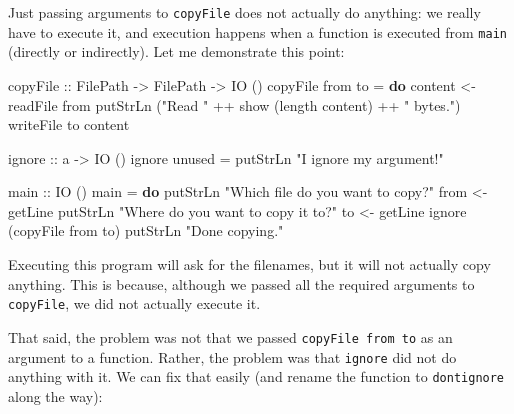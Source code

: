 \documentclass[11pt,
  american,
  DIV13]{article}
\newenvironment{Shaded}{}{}
\newcommand{\DataTypeTok}[1]{\textcolor[rgb]{0.56,0.13,0.00}{#1}}
\newcommand{\FunctionTok}[1]{\textcolor[rgb]{0.02,0.16,0.49}{#1}}
\newcommand{\KeywordTok}[1]{\textcolor[rgb]{0.00,0.44,0.13}{\textbf{#1}}}
\newcommand{\NormalTok}[1]{#1}
\newcommand{\OperatorTok}[1]{\textcolor[rgb]{0.40,0.40,0.40}{#1}}
\newcommand{\OtherTok}[1]{\textcolor[rgb]{0.00,0.44,0.13}{#1}}
\newcommand{\StringTok}[1]{\textcolor[rgb]{0.25,0.44,0.63}{#1}}
\begin{document}
Just passing arguments to \texttt{copyFile} does not actually do
anything: we really have to execute it, and execution happens when a
function is executed from \texttt{main} (directly or indirectly). Let me
demonstrate this point:

\begin{Shaded}
\begin{Highlighting}[]
\OtherTok{copyFile ::} \DataTypeTok{FilePath} \OtherTok{{-}\textgreater{}} \DataTypeTok{FilePath} \OtherTok{{-}\textgreater{}} \DataTypeTok{IO}\NormalTok{ ()}
\NormalTok{copyFile from to }\OtherTok{=} \KeywordTok{do}
\NormalTok{    content }\OtherTok{\textless{}{-}} \FunctionTok{readFile}\NormalTok{ from}
    \FunctionTok{putStrLn}\NormalTok{ (}\StringTok{"Read "} \OperatorTok{++} \FunctionTok{show}\NormalTok{ (}\FunctionTok{length}\NormalTok{ content) }\OperatorTok{++} \StringTok{" bytes."}\NormalTok{)}
    \FunctionTok{writeFile}\NormalTok{ to content}

\OtherTok{ignore ::}\NormalTok{ a }\OtherTok{{-}\textgreater{}} \DataTypeTok{IO}\NormalTok{ ()}
\NormalTok{ignore unused }\OtherTok{=} \FunctionTok{putStrLn} \StringTok{"I ignore my argument!"}

\OtherTok{main ::} \DataTypeTok{IO}\NormalTok{ ()}
\NormalTok{main }\OtherTok{=} \KeywordTok{do}
    \FunctionTok{putStrLn} \StringTok{"Which file do you want to copy?"}
\NormalTok{    from }\OtherTok{\textless{}{-}} \FunctionTok{getLine}
    \FunctionTok{putStrLn} \StringTok{"Where do you want to copy it to?"}
\NormalTok{    to }\OtherTok{\textless{}{-}} \FunctionTok{getLine}
\NormalTok{    ignore (copyFile from to)}
    \FunctionTok{putStrLn} \StringTok{"Done copying."}
\end{Highlighting}
\end{Shaded}

Executing this program will ask for the filenames, but it will not
actually copy anything. This is because, although we passed all the
required arguments to \texttt{copyFile}, we did not actually execute it.

That said, the problem was not that we passed
\texttt{copyFile\ from\ to} as an argument to a function. Rather, the
problem was that \texttt{ignore} did not do anything with it. We can fix
that easily (and rename the function to
\texttt{don\textquotesingle{}tignore} along the way):
\end{document}
